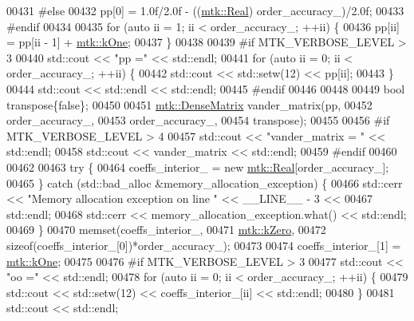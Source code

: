 \begin{DoxyCode}
{{00431 \textcolor{preprocessor}{  #else}
00432   pp[0] = 1.0f/2.0f - ((\hyperlink{group__c01-roots_gac080bbbf5cbb5502c9f00405f894857d}{mtk::Real}) order\_accuracy\_)/2.0f;
00433 \textcolor{preprocessor}{  #endif}
00434 
00435   \textcolor{keywordflow}{for} (\textcolor{keyword}{auto} ii = 1; ii < order\_accuracy\_; ++ii) \{
00436     pp[ii] = pp[ii - 1] + \hyperlink{group__c01-roots_ga26407c24d43b6b95480943340d285c71}{mtk::kOne};
00437   \}
00438 
00439 \textcolor{preprocessor}{  #if MTK\_VERBOSE\_LEVEL > 3}
00440   std::cout << \textcolor{stringliteral}{"pp ="} << std::endl;
00441   \textcolor{keywordflow}{for} (\textcolor{keyword}{auto} ii = 0; ii < order\_accuracy\_; ++ii) \{
00442     std::cout << std::setw(12) << pp[ii];
00443   \}
00444   std::cout << std::endl << std::endl;
00445 \textcolor{preprocessor}{  #endif}
00446 
00448 
00449   \textcolor{keywordtype}{bool} transpose\{\textcolor{keyword}{false}\};
00450 
00451   \hyperlink{classmtk_1_1DenseMatrix}{mtk::DenseMatrix} vander\_matrix(pp,
00452                                  order\_accuracy\_,
00453                                  order\_accuracy\_,
00454                                  transpose);
00455 
00456 \textcolor{preprocessor}{  #if MTK\_VERBOSE\_LEVEL > 4}
00457   std::cout << \textcolor{stringliteral}{"vander\_matrix = "} << std::endl;
00458   std::cout << vander\_matrix << std::endl;
00459 \textcolor{preprocessor}{  #endif}
00460 
00462 
00463   \textcolor{keywordflow}{try} \{
00464     coeffs\_interior\_ = \textcolor{keyword}{new} \hyperlink{group__c01-roots_gac080bbbf5cbb5502c9f00405f894857d}{mtk::Real}[order\_accuracy\_];
00465   \} \textcolor{keywordflow}{catch} (std::bad\_alloc &memory\_allocation\_exception) \{
00466     std::cerr << \textcolor{stringliteral}{"Memory allocation exception on line "} << \_\_LINE\_\_ - 3 <<
00467       std::endl;
00468     std::cerr << memory\_allocation\_exception.what() << std::endl;
00469   \}
00470   memset(coeffs\_interior\_,
00471          \hyperlink{group__c01-roots_ga59a451a5fae30d59649bcda274fea271}{mtk::kZero},
00472          \textcolor{keyword}{sizeof}(coeffs\_interior\_[0])*order\_accuracy\_);
00473 
00474   coeffs\_interior\_[1] = \hyperlink{group__c01-roots_ga26407c24d43b6b95480943340d285c71}{mtk::kOne};
00475 
00476 \textcolor{preprocessor}{  #if MTK\_VERBOSE\_LEVEL > 3}
00477   std::cout << \textcolor{stringliteral}{"oo ="} << std::endl;
00478   \textcolor{keywordflow}{for} (\textcolor{keyword}{auto} ii = 0; ii < order\_accuracy\_; ++ii) \{
00479     std::cout << std::setw(12) << coeffs\_interior\_[ii] << std::endl;
00480   \}
00481   std::cout << std::endl;
}}
\end{DoxyCode}
